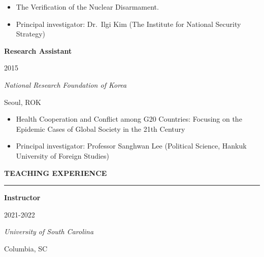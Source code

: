 \documentclass[
  16,
]{article}
\providecommand{\tightlist}{%
  \setlength{\itemsep}{0pt}\setlength{\parskip}{0pt}}\usepackage{longtable,booktabs,array}
\begin{document}
\begin{itemize}
\tightlist
\item
  The Verification of the Nuclear Disarmament.
\item
  Principal investigator: Dr.~Ilgi Kim (The Institute for National
  Security Strategy)
\end{itemize}

\vspace{7pt}

\begin{large}
  \begin{multicols}{2}
    \begin{flushleft}{\bf Research Assistant}\end{flushleft}
    \begin{flushright}2015\end{flushright}
  \end{multicols}
  \vspace{-0.17cm}
  \begin{multicols}{2}
    \begin{flushleft}\textit{National Research Foundation of Korea}\end{flushleft}
    \begin{flushright}Seoul, ROK\end{flushright}
  \end{multicols}
  \end{large}
\vspace{-0.16cm}

\begin{itemize}
\tightlist
\item
  Health Cooperation and Conflict among G20 Countries: Focusing on the
  Epidemic Cases of Global Society in the 21th Century
\item
  Principal investigator: Professor Sanghwan Lee (Political Science,
  Hankuk University of Foreign Studies)
\end{itemize}

\vspace{7pt}

\begin{large}{\bf TEACHING EXPERIENCE}
  \vspace{3pt}
  \hrule
  \begin{multicols}{2}
    \begin{flushleft}{\bf Instructor}\end{flushleft}
    \begin{flushright}2021-2022\end{flushright}
  \end{multicols}
  \vspace{-0.17cm}
  \begin{multicols}{2}
    \begin{flushleft}\textit{University of South Carolina}\end{flushleft}
    \begin{flushright}Columbia, SC\end{flushright}
  \end{multicols}
  \end{large}
\vspace{-0.16cm}
\end{document}
